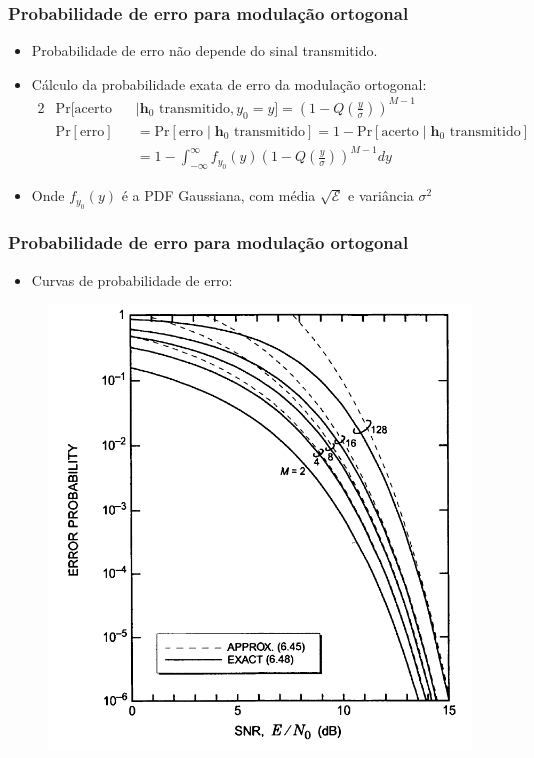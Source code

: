 \begin{frame}
	\frametitle{Probabilidade de erro para modulação ortogonal}

	\begin{itemize}
	    \item Probabilidade de erro não depende do sinal transmitido.
	    \item Cálculo da probabilidade exata de erro da modulação ortogonal:
	    \begin{alignat*}{2}
		&\mathrm{Pr}[\text{acerto}&& \mid \mathbf{h}_0 \text{ transmitido},y_0=y] = \left(1 - Q\left( \frac{y}{\sigma} \right) \right)^{M-1} \\
		&\mathrm{Pr}[\text{erro}] &&= \mathrm{Pr}[\text{erro} \mid \mathbf{h}_0 \text{ transmitido}] = 1 - \mathrm{Pr}[\text{acerto} \mid \mathbf{h}_0 \text{ transmitido}] \\
		& &&= 1 - \int_{-\infty}^{\infty} f_{y_0}(y) \left( 1 - Q\left(\frac{y}{\sigma} \right) \right)^{M-1} dy
	    \end{alignat*}
	    \item Onde $f_{y_0}(y)$ é a PDF Gaussiana, com média $\sqrt{\mathcal{E}}$ e variância $\sigma^2$
	\end{itemize}	
\end{frame}

\begin{frame}
	\frametitle{Probabilidade de erro para modulação ortogonal}

	\begin{itemize}
	    \item Curvas de probabilidade de erro:
	\end{itemize}	
	\begin{figure}[t]	
	    \begin{center}
	    \includegraphics[width=0.5\columnwidth]{figs/adv_08}
	    \end{center}
	\end{figure}
\end{frame}

